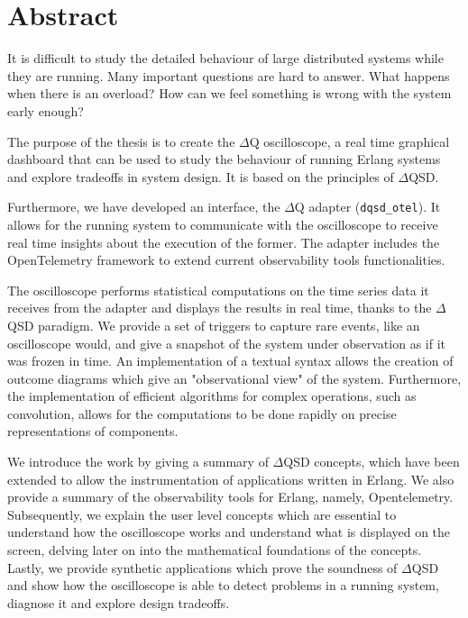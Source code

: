 \chapter*{Abstract}
    It is difficult to study the detailed behaviour of large distributed systems while they are running. Many important questions are hard to answer. What happens when there is an overload? How can we feel something is wrong with the system early enough?

    The purpose of the thesis is to create the $\Delta$Q oscilloscope, a real time graphical dashboard that can be used to study the behaviour of running Erlang systems and explore tradeoffs in system design. It is based on the principles of $\Delta$QSD.
  
    Furthermore, we have developed an interface, the $\Delta$Q adapter (\texttt{dqsd\_otel}). It allows for the running system to communicate with the oscilloscope to receive real time insights about the execution of the former. The adapter includes the OpenTelemetry framework to extend current observability tools functionalities.
    
    The oscilloscope performs statistical computations on the time series data it receives from the adapter and displays the results in real time, thanks to the $\Delta$QSD paradigm. We provide a set of triggers to capture rare events, like an oscilloscope would, and give a snapshot of the system under observation as if it was frozen in time. An implementation of a textual syntax allows the creation of outcome diagrams which give an "observational view" of the system. Furthermore, the implementation of efficient algorithms for complex operations, such as convolution, allows for the computations to be done rapidly on precise representations of components.

    We introduce the work by giving a summary of $\Delta$QSD concepts, which have been extended to allow the instrumentation of applications written in Erlang. We also provide a summary of the observability tools for Erlang, namely, Opentelemetry. Subsequently, we explain the user level concepts which are essential to understand how  the oscilloscope works and understand what is displayed on the screen, delving later on into the mathematical foundations of the concepts. Lastly, we provide synthetic applications which prove the soundness of $\Delta$QSD and show how the oscilloscope is able to detect problems in a running system, diagnose it and explore design tradeoffs.



